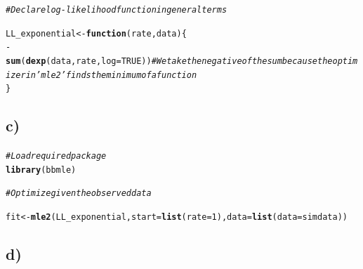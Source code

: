 \documentclass[12pt]{article}\usepackage[]{graphicx}\usepackage[]{color}
\makeatletter
\newcommand{\hlnum}[1]{\textcolor[rgb]{0.686,0.059,0.569}{#1}}%
\newcommand{\hlcom}[1]{\textcolor[rgb]{0.678,0.584,0.686}{\textit{#1}}}%
\newcommand{\hlopt}[1]{\textcolor[rgb]{0,0,0}{#1}}%
\newcommand{\hlstd}[1]{\textcolor[rgb]{0.345,0.345,0.345}{#1}}%
\newcommand{\hlkwa}[1]{\textcolor[rgb]{0.161,0.373,0.58}{\textbf{#1}}}%
\newcommand{\hlkwb}[1]{\textcolor[rgb]{0.69,0.353,0.396}{#1}}%
\newcommand{\hlkwc}[1]{\textcolor[rgb]{0.333,0.667,0.333}{#1}}%
\newcommand{\hlkwd}[1]{\textcolor[rgb]{0.737,0.353,0.396}{\textbf{#1}}}%
\newenvironment{kframe}{%
 \def\at@end@of@kframe{}%
 \ifinner\ifhmode%
  \def\at@end@of@kframe{\end{minipage}}%
  \begin{minipage}{\columnwidth}%
 \fi\fi%
 \def\FrameCommand##1{\hskip\@totalleftmargin \hskip-\fboxsep
 \colorbox{shadecolor}{##1}\hskip-\fboxsep
     \hskip-\linewidth \hskip-\@totalleftmargin \hskip\columnwidth}%
 \MakeFramed {\advance\hsize-\width
   \@totalleftmargin\z@ \linewidth\hsize
   \@setminipage}}%
 {\par\unskip\endMakeFramed%
 \at@end@of@kframe}
\newenvironment{knitrout}{}{} %
\makeatother
\begin{document}
\begin{knitrout}
\color{fgcolor}\begin{kframe}
\begin{alltt}
\hlcom{# Declare log-likelihood function in general terms}

\hlstd{LL_exponential} \hlkwb{<-} \hlkwa{function}\hlstd{(}\hlkwc{rate}\hlstd{,} \hlkwc{data}\hlstd{) \{}
    \hlopt{-}\hlkwd{sum}\hlstd{(}\hlkwd{dexp}\hlstd{(data, rate,} \hlkwc{log} \hlstd{=} \hlnum{TRUE}\hlstd{))}  \hlcom{#We take the negative of the sum because the optimizer in 'mle2' finds the minimum of a function}
\hlstd{\}}
\end{alltt}
\end{kframe}
\end{knitrout}

\subsection*{c)}

\begin{knitrout}
\color{fgcolor}\begin{kframe}
\begin{alltt}
\hlcom{# Load required package}
\hlkwd{library}\hlstd{(bbmle)}
\end{alltt}


{\ttfamily\noindent\itshape\color{messagecolor}{\#\# Loading required package: stats4}}\begin{alltt}
\hlcom{# Optimize given the observed data}

\hlstd{fit} \hlkwb{<-} \hlkwd{mle2}\hlstd{(LL_exponential,} \hlkwc{start} \hlstd{=} \hlkwd{list}\hlstd{(}\hlkwc{rate} \hlstd{=} \hlnum{1}\hlstd{),} \hlkwc{data} \hlstd{=} \hlkwd{list}\hlstd{(}\hlkwc{data} \hlstd{= simdata))}
\end{alltt}


{\ttfamily\noindent\color{warningcolor}{\#\# Warning in dexp(data, rate, log = TRUE): NaNs produced}}

{\ttfamily\noindent\color{warningcolor}{\#\# Warning in dexp(data, rate, log = TRUE): NaNs produced}}

{\ttfamily\noindent\color{warningcolor}{\#\# Warning in dexp(data, rate, log = TRUE): NaNs produced}}\end{kframe}
\end{knitrout}

\subsection*{d)}
\end{document}
